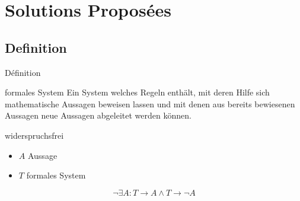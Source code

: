 \section{Solutions Proposées}
\subsection{Definition}
\begin{frame}{Définition}
    \begin{block}{formales System}
        Ein System welches Regeln enthält, mit deren Hilfe sich mathematische Aussagen beweisen lassen und mit denen aus bereits bewiesenen Aussagen neue Aussagen abgeleitet werden können.
    \end{block}
    \begin{block}{widerspruchsfrei}
        \begin{itemize}
            \item $A$ Aussage
            \item $T$ formales System
        \end{itemize}
        $$\neg\exists A: T\rightarrow{}A \wedge T\rightarrow{}\neg{}A $$
    \end{block}
\end{frame}